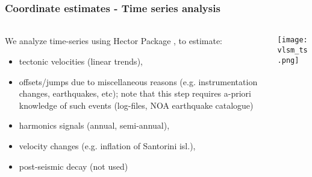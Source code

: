 \begin{frame}
  \frametitle{Coordinate estimates - Time series analysis}
  \framesubtitle{}
  \label{}
  \vskip-1cm
  \begin{columns}[T]
    \begin{column}{.4\textwidth}
      \footnotesize{
      We analyze time-series using Hector Package \citep{Bos2012}, to estimate:
      \begin{itemize}
        \item tectonic velocities (linear trends),
        \item offsets/jumps due to miscellaneous reasons (e.g. instrumentation 
          changes, earthquakes, etc); note that this step requires a-priori 
          knowledge of such events (log-files, NOA earthquake catalogue)
        \item harmonics signals (annual, semi-annual),
        \item velocity changes (e.g. inflation of Santorini isl.),
        \item post-seismic decay (not used)
      \end{itemize}}
    \end{column}
    \begin{column}{.6\textwidth}
      \begin{center}
        \texttt{[image: vlsm\_ts.png]}
      \end{center}
    \end{column}
  \end{columns}
 
\end{frame}
\note{}

